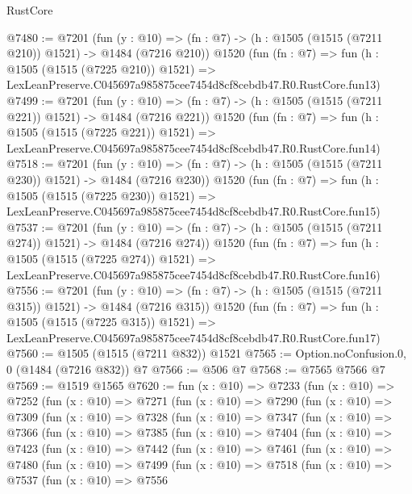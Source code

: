 \begin{lexlean}{RustCore}
\begin{coremodule}
@7480 := @7201
    (fun (y : @10) => (fn : @7) -> (h : @1505 (@1515 (@7211 @210)) @1521) -> @1484 (@7216 @210))
    @1520
    (fun (fn : @7) =>
    fun (h : @1505 (@1515 (@7225 @210)) @1521) =>
    LexLeanPreserve.C045697a985875cee7454d8cf8cebdb47.R0.RustCore.fun13)
@7499 := @7201
    (fun (y : @10) => (fn : @7) -> (h : @1505 (@1515 (@7211 @221)) @1521) -> @1484 (@7216 @221))
    @1520
    (fun (fn : @7) =>
    fun (h : @1505 (@1515 (@7225 @221)) @1521) =>
    LexLeanPreserve.C045697a985875cee7454d8cf8cebdb47.R0.RustCore.fun14)
@7518 := @7201
    (fun (y : @10) => (fn : @7) -> (h : @1505 (@1515 (@7211 @230)) @1521) -> @1484 (@7216 @230))
    @1520
    (fun (fn : @7) =>
    fun (h : @1505 (@1515 (@7225 @230)) @1521) =>
    LexLeanPreserve.C045697a985875cee7454d8cf8cebdb47.R0.RustCore.fun15)
@7537 := @7201
    (fun (y : @10) => (fn : @7) -> (h : @1505 (@1515 (@7211 @274)) @1521) -> @1484 (@7216 @274))
    @1520
    (fun (fn : @7) =>
    fun (h : @1505 (@1515 (@7225 @274)) @1521) =>
    LexLeanPreserve.C045697a985875cee7454d8cf8cebdb47.R0.RustCore.fun16)
@7556 := @7201
    (fun (y : @10) => (fn : @7) -> (h : @1505 (@1515 (@7211 @315)) @1521) -> @1484 (@7216 @315))
    @1520
    (fun (fn : @7) =>
    fun (h : @1505 (@1515 (@7225 @315)) @1521) =>
    LexLeanPreserve.C045697a985875cee7454d8cf8cebdb47.R0.RustCore.fun17)
@7560 := @1505 (@1515 (@7211 @832)) @1521
@7565 := Option.noConfusion.{0, 0} (@1484 (@7216 @832)) @7
@7566 := @506 @7
@7568 := @7565 @7566 @7
@7569 := @1519 @1565
@7620 := fun (x : @10) =>
  @7233
    (fun (x : @10) =>
    @7252
      (fun (x : @10) =>
      @7271
        (fun (x : @10) =>
        @7290
          (fun (x : @10) =>
          @7309
            (fun (x : @10) =>
            @7328
              (fun (x : @10) =>
              @7347
                (fun (x : @10) =>
                @7366
                  (fun (x : @10) =>
                  @7385
                    (fun (x : @10) =>
                    @7404
                      (fun (x : @10) =>
                      @7423
                        (fun (x : @10) =>
                        @7442
                          (fun (x : @10) =>
                          @7461
                            (fun (x : @10) =>
                            @7480
                              (fun (x : @10) =>
                              @7499
                                (fun (x : @10) =>
                                @7518
                                  (fun (x : @10) =>
                                  @7537
                                    (fun (x : @10) =>
                                    @7556

\end{coremodule}
\end{lexlean}
